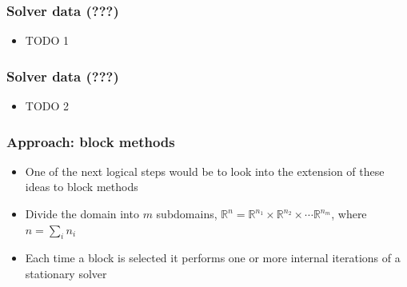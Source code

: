 \documentclass{beamer}
\begin{document}
\begin{frame}
	\frametitle{Solver data (???)}
	\begin{itemize}
	    \item TODO 1
	\end{itemize}
\end{frame}

\begin{frame}
	\frametitle{Solver data (???)}
	\begin{itemize}
	    \item TODO 2
	\end{itemize}
\end{frame}

\begin{frame}
	\frametitle{Approach: block methods}
	\begin{itemize}
	    \item One of the next logical steps would be to look into the extension of these ideas to block methods
		\item Divide the domain into $m$ subdomains, $\mathbb{R}^n = \mathbb{R}^{n_1} \times \mathbb{R}^{n_2} \times \cdots \mathbb{R}^{n_m}$, where $n = \sum_i n_i$
		\item Each time a block is selected it performs one or more internal iterations of a stationary solver
	\end{itemize}
\end{frame}
\end{document}
